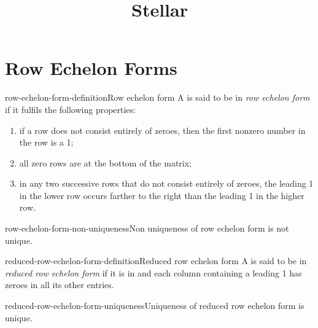 \documentclass[preview]{standalone}
\begin{document}
\title{Stellar}
\genpage

\section{Row Echelon Forms}

\begin{snippetdefinition}{row-echelon-form-definition}{Row echelon form}
    A  is said to be in \textit{row echelon form}
    if it fulfils the following properties:
    \begin{enumerate}
        \item if a row does not consist entirely of zeroes, then the first nonzero number in the row is a 1;
        \item all zero rows are at the bottom of the matrix;
        \item in any two successive rows that do not consist entirely of zeroes, the leading 1 in the lower
            row occurs farther to the right than the leading 1 in the higher row.
    \end{enumerate}
\end{snippetdefinition}

\begin{snippetproposition}{row-echelon-form-non-uniqueness}{Non uniqueness of row echelon form}
     is not unique.
\end{snippetproposition}

\begin{snippetdefinition}{reduced-row-echelon-form-definition}{Reduced row echelon form}
    A  is said to be in \textit{reduced row echelon form}
    if it is in  and
    each column containing a leading 1 has zeroes in all its other entries.
\end{snippetdefinition}

\begin{snippetproposition}{reduced-row-echelon-form-uniqueness}{Uniqueness of reduced row echelon form}
     is unique.
\end{snippetproposition}
\end{document}
